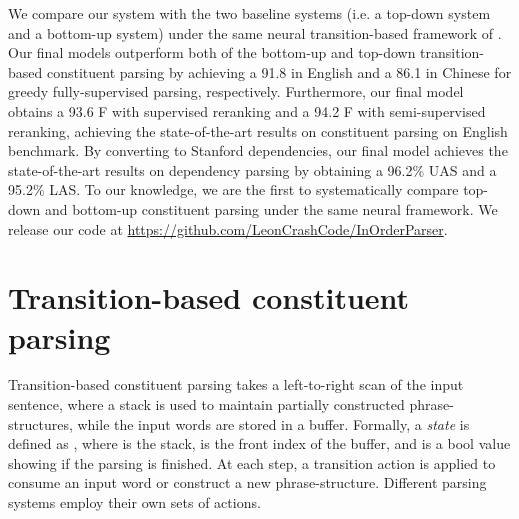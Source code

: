 \documentclass[11pt,letterpaper]{article}
\begin{document}
We compare our system with the two baseline systems (i.e. a top-down system and a bottom-up system) under the same neural transition-based framework of . 
Our final models outperform both of the bottom-up and top-down transition-based constituent parsing by achieving a 91.8  in English and a 86.1  in Chinese for greedy fully-supervised parsing, respectively.
Furthermore, our final model obtains a 93.6 F with supervised reranking \cite{choe:2016} and a 94.2 F with semi-supervised reranking, achieving the state-of-the-art results on constituent parsing on English benchmark.
By converting to Stanford dependencies, our final model achieves the state-of-the-art results on dependency parsing by obtaining a 96.2\% UAS and a 95.2\% LAS.
To our knowledge, we are the first to systematically compare top-down and bottom-up constituent parsing under the same neural framework.
We release our code at \url{https://github.com/LeonCrashCode/InOrderParser}.

\section{Transition-based constituent parsing}
Transition-based constituent parsing takes a left-to-right scan of the input sentence, where a stack is used to maintain partially constructed phrase-structures, while the input words are stored in a buffer.
Formally, a \textit{state} is defined as , where  is the stack,  is the front index of the buffer, and  is a bool value showing if the parsing is finished.
At each step, a transition action is applied to consume an input word or construct a new phrase-structure.
Different parsing systems employ their own sets of actions.
\end{document}
